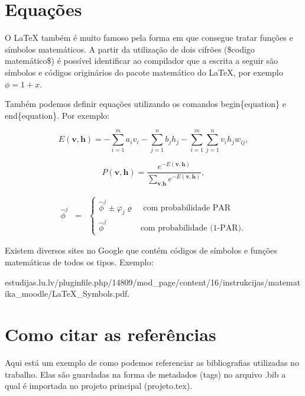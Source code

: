 \section{Equações}
\label{s.equacoes}

O LaTeX também é muito famoso pela forma em que consegue tratar funções e símbolos matemáticos. A partir da utilização de dois cifrões (\$codigo matemático\$) é possível identificar ao compilador que a escrita a seguir são símbolos e códigos originários do pacote matemático do LaTeX, por exemplo $\phi = 1 + x$.

Também podemos definir equações utilizando os comandos begin\{equation\} e end\{equation\}. Por exemplo:

\begin{equation}
	\label{e.energy-rbm}
	E(\textbf{v},\textbf{h})=-\sum_{i=1}^ma_iv_i-\sum_{j=1}^nb_jh_j-\sum_{i=1}^m\sum_{j=1}^nv_ih_jw_{ij},
\end{equation}

\begin{equation}
	\label{e.probability-configuration}
	P(\textbf{v},\textbf{h})=\frac{e^{-E(\textbf{v},\textbf{h})}}{\displaystyle\sum_{\textbf{v},\textbf{h}}e^{-E(\textbf{v},\textbf{h})}},
\end{equation}

\begin{eqnarray}
	\label{eq:par}
	\hat{\phi}^j & = & \left\{ \begin{array}{ll} \hat{\phi}^j\pm \varphi_j \varrho  & \mbox{{ com probabilidade PAR}} \\
	\hat{\phi}^j & \mbox{{com probabilidade (1-PAR).}}
	\end{array}\right.
\end{eqnarray}

Existem diversos sites no Google que contém códigos de símbolos e funções matemáticas de todos os tipos. Exemplo:\\
\begin{center}
	\tiny estudijas.lu.lv/pluginfile.php/14809/mod\_page/content/16/instrukcijas/matematika\_moodle/LaTeX\_Symbols.pdf.
\end{center}

\section{Como citar as referências}
\label{ss.referencias}

Aqui está um exemplo de como podemos referenciar as bibliografias utilizadas no trabalho. Elas são guardadas na forma de metadados (tags) no arquivo .bib a qual é importada no projeto principal (projeto.tex).

